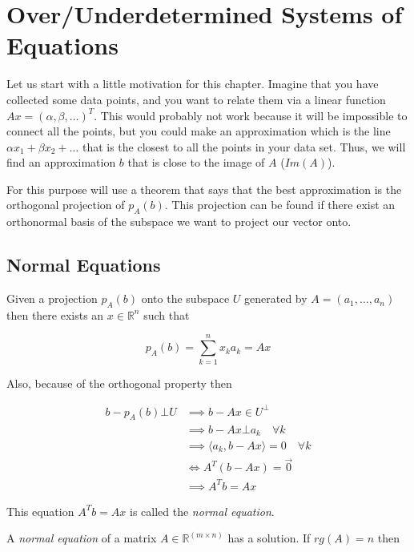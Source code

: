 \newpage
\section{Over/Underdetermined Systems of Equations}

Let us start with a little motivation for this chapter. Imagine that you have collected some data points, 
and you want to relate them via a linear function \(Ax = (\alpha, \beta, \dots)^T\). This would probably not work because 
it will be impossible to connect all the points, but you could make an approximation 
which is the line \(\alpha x_1 + \beta x_2 + \dots\) that is the closest to all the points in your data set. Thus, we will find an approximation 
\(b\) that is close to the image of \(A\) (\(Im(A)\)).
\vspace{\baselineskip}

For this purpose will use a theorem that says that the best approximation is the orthogonal projection of 
\(p_A (b)\). This projection can be found if there exist an orthonormal basis of the subspace we want to project 
our vector onto.

\subsection{Normal Equations}

Given a projection \(p_A (b)\) onto the subspace \(U\) generated by \(A = (a_1, \dots, a_n)\) then there exists an 
\(x \in \mathbb{R}^n\) such that 

\[
p_{A}(b) = \sum_{k = 1}^{n} x_k a_k = Ax
\]

Also, because of the orthogonal property then

\begin{align*}
b - p_{A}(b) \bot U &\implies b - Ax  \in U^{\bot}\\
					&\implies b - Ax \bot a_k \quad \forall k\\
					&\implies \langle a_k, b - Ax \rangle = 0 \quad \forall k\\
					&\iff A^{T} (b - Ax) = \vec{0}\\
					&\implies A^{T}b = Ax 
\end{align*}

This equation \(A^{T}b = Ax\) is called the \emph{normal equation}.
\vspace{\baselineskip}

A \emph{normal equation} of a matrix \(A \in \mathbb{R}^{(m \times n)}\) has a solution. 
If \(rg(A) = n\) then 

